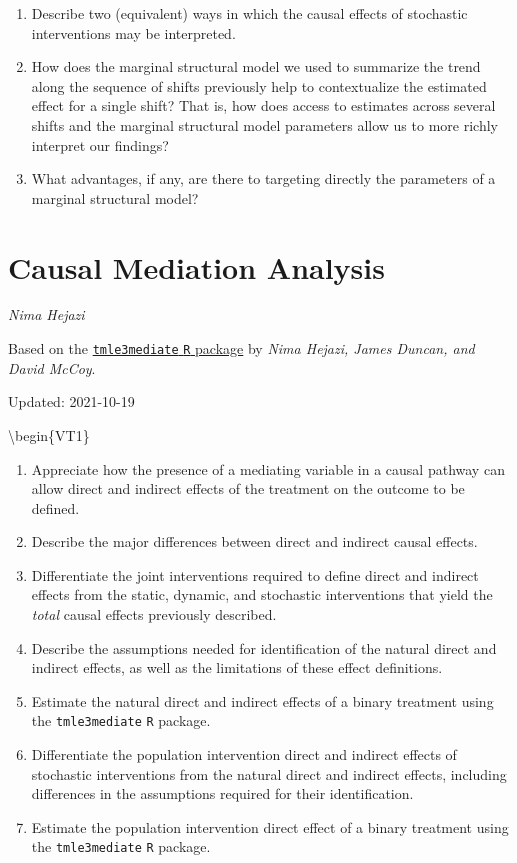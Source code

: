 \documentclass[
  12pt, krantz2,
]{krantz}
\newcommand{\passthrough}[1]{#1}
\providecommand{\tightlist}{%
  \setlength{\itemsep}{0pt}\setlength{\parskip}{0pt}}
\theoremstyle{definition}
\theoremstyle{definition}
\theoremstyle{definition}
\newcommand{\1}{\mathbbm{1}}
\begin{document}
\begin{enumerate}
\def\labelenumi{\arabic{enumi}.}
\item
  Describe two (equivalent) ways in which the causal effects of stochastic
  interventions may be interpreted.
\item
  How does the marginal structural model we used to summarize the trend along
  the sequence of shifts previously help to contextualize the estimated effect
  for a single shift? That is, how does access to estimates across several
  shifts and the marginal structural model parameters allow us to more richly
  interpret our findings?
\item
  What advantages, if any, are there to targeting directly the parameters of a
  marginal structural model?
\end{enumerate}

\hypertarget{causal-mediation-analysis}{%
\chapter{Causal Mediation Analysis}\label{causal-mediation-analysis}}

\emph{Nima Hejazi}

Based on the \href{https://github.com/tlverse/tmle3mediate}{\passthrough{\lstinline!tmle3mediate!} \passthrough{\lstinline!R!}
package} by \emph{Nima Hejazi, James
Duncan, and David McCoy}.

Updated: 2021-10-19

\textbackslash begin\{VT1\}

\begin{enumerate}
\def\labelenumi{\arabic{enumi}.}
\tightlist
\item
  Appreciate how the presence of a mediating variable in a causal pathway can
  allow direct and indirect effects of the treatment on the outcome to be
  defined.
\item
  Describe the major differences between direct and indirect causal effects.
\item
  Differentiate the joint interventions required to define direct and indirect
  effects from the static, dynamic, and stochastic interventions that yield
  the \emph{total} causal effects previously described.
\item
  Describe the assumptions needed for identification of the natural direct and
  indirect effects, as well as the limitations of these effect definitions.
\item
  Estimate the natural direct and indirect effects of a binary treatment using
  the \passthrough{\lstinline!tmle3mediate!} \passthrough{\lstinline!R!} package.
\item
  Differentiate the population intervention direct and indirect effects of
  stochastic interventions from the natural direct and indirect effects,
  including differences in the assumptions required for their identification.
\item
  Estimate the population intervention direct effect of a binary treatment
  using the \passthrough{\lstinline!tmle3mediate!} \passthrough{\lstinline!R!} package.
\end{enumerate}
\end{document}
